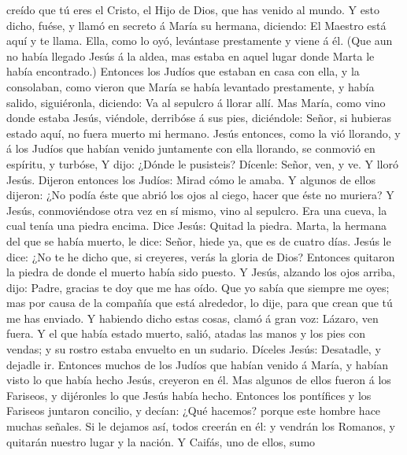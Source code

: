 creído que tú eres el Cristo, el Hijo de Dios, que has venido al mundo.
 Y esto dicho, fuése, y llamó en secreto á María su
hermana, diciendo: El Maestro está aquí y te llama. 
Ella, como lo oyó, levántase prestamente y viene á él. 
(Que aun no había llegado Jesús á la aldea, mas estaba en aquel lugar
donde Marta le había encontrado.)  Entonces los Judíos
que estaban en casa con ella, y la consolaban, como vieron que María se
había levantado prestamente, y había salido, siguiéronla, diciendo: Va
al sepulcro á llorar allí.  Mas María, como vino donde
estaba Jesús, viéndole, derribóse á sus pies, diciéndole: Señor, si
hubieras estado aquí, no fuera muerto mi hermano.  Jesús
entonces, como la vió llorando, y á los Judíos que habían venido
juntamente con ella llorando, se conmovió en espíritu, y turbóse,
 Y dijo: ¿Dónde le pusisteis? Dícenle: Señor, ven, y ve.
 Y lloró Jesús.  Dijeron entonces los
Judíos: Mirad cómo le amaba.  Y algunos de ellos dijeron:
¿No podía éste que abrió los ojos al ciego, hacer que éste no muriera?
 Y Jesús, conmoviéndose otra vez en sí mismo, vino al
sepulcro. Era una cueva, la cual tenía una piedra encima.
 Dice Jesús: Quitad la piedra. Marta, la hermana del que
se había muerto, le dice: Señor, hiede ya, que es de cuatro días.
 Jesús le dice: ¿No te he dicho que, si creyeres, verás
la gloria de Dios?  Entonces quitaron la piedra de donde
el muerto había sido puesto. Y Jesús, alzando los ojos arriba, dijo:
Padre, gracias te doy que me has oído.  Que yo sabía que
siempre me oyes; mas por causa de la compañía que está alrededor, lo
dije, para que crean que tú me has enviado.  Y habiendo
dicho estas cosas, clamó á gran voz: Lázaro, ven fuera. 
Y el que había estado muerto, salió, atadas las manos y los pies con
vendas; y su rostro estaba envuelto en un sudario. Díceles Jesús:
Desatadle, y dejadle ir.  Entonces muchos de los Judíos
que habían venido á María, y habían visto lo que había hecho Jesús,
creyeron en él.  Mas algunos de ellos fueron á los
Fariseos, y dijéronles lo que Jesús había hecho. 
Entonces los pontífices y los Fariseos juntaron concilio, y decían: ¿Qué
hacemos? porque este hombre hace muchas señales.  Si le
dejamos así, todos creerán en él: y vendrán los Romanos, y quitarán
nuestro lugar y la nación.  Y Caifás, uno de ellos, sumo
